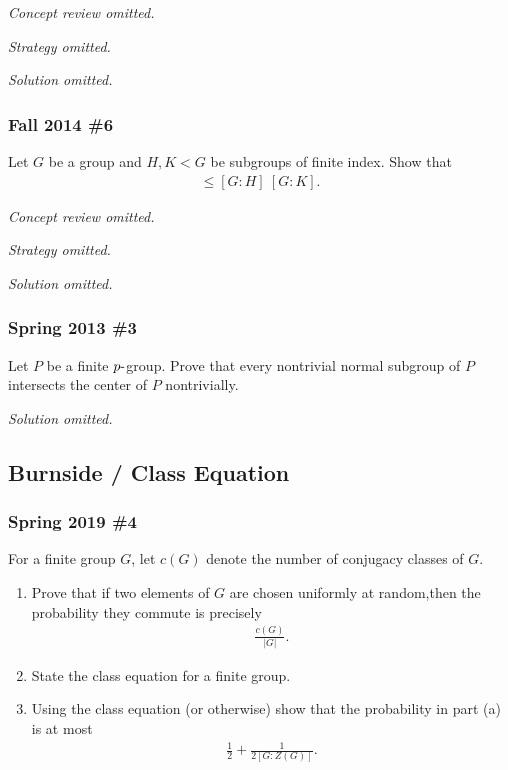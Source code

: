 \emph{Concept review omitted.}

\emph{Strategy omitted.}

\emph{Solution omitted.}

\hypertarget{fall-2014-6}{%
\subsubsection{Fall 2014 \#6}\label{fall-2014-6}}

Let \(G\) be a group and \(H, K < G\) be subgroups of finite index. Show
that
\begin{align*}
[G: H\cap K] \leq [G: H] ~ [G:K]
.\end{align*}

\emph{Concept review omitted.}

\emph{Strategy omitted.}

\emph{Solution omitted.}

\hypertarget{spring-2013-3}{%
\subsubsection{Spring 2013 \#3}\label{spring-2013-3}}

Let \(P\) be a finite \(p{\hbox{-}}\)group. Prove that every nontrivial
normal subgroup of \(P\) intersects the center of \(P\) nontrivially.


\emph{Solution omitted.}

\hypertarget{burnside-class-equation}{%
\subsection{Burnside / Class Equation}\label{burnside-class-equation}}

\hypertarget{spring-2019-4}{%
\subsubsection{Spring 2019 \#4}\label{spring-2019-4}}

For a finite group \(G\), let \(c(G)\) denote the number of conjugacy
classes of \(G\).

\begin{enumerate}
\def\labelenumi{\alph{enumi}.}
\item
  Prove that if two elements of \(G\) are chosen uniformly at
  random,then the probability they commute is precisely
  \begin{align*}
  \frac{c(G)}{{\left\lvert {G} \right\rvert}}
  .\end{align*}
\item
  State the class equation for a finite group.
\item
  Using the class equation (or otherwise) show that the probability in
  part (a) is at most
  \begin{align*}
  \frac 1 2 + \frac 1 {2[G : Z(G)]}
  .\end{align*}
\end{enumerate}

